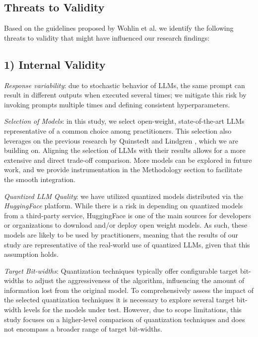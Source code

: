 \documentclass[conference]{IEEEtran}
\begin{document}
\subsection{Threats to Validity}

Based on the guidelines proposed by Wohlin et al. \cite{wohlin2012experimentation} we identify the following threats to validity that might have influenced our research findings: 

\subsection*{\textbf{1) Internal Validity}}

\textit{Response variability}: due to stochastic behavior of LLMs, the same prompt can result in different outputs when executed several times; we mitigate this risk by invoking prompts multiple times and defining consistent hyperparameters.

\textit{Selection of Models}: in this study, we select open-weight, state-of-the-art LLMs representative of a common choice among practitioners. This selection also leverages on the previous research by Quinstedt and Lindgren \cite{quinstedt2024Optimizing}, which we are building on. Aligning the selection of LLMs with their results allows for a more extensive and direct trade-off comparison. More models can be explored in future work, and we provide instrumentation in the Methodology section to facilitate the smooth integration.

\textit{Quantized LLM Quality}: we have utilized quantized models distributed via the \textit{HuggingFace} platform. While there is a risk in depending on quantized models from a third-party service, HuggingFace is one of the main sources for developers or organizations to download and/or deploy open weight models. As such, these models are likely to be used by practitioners, meaning that the results of our study are representative of the real-world use of quantized LLMs, given that this assumption holds.

\textit{Target Bit-widths}: Quantization techniques typically offer configurable target bit-widths to adjust the aggressiveness of the algorithm, influencing the amount of information lost from the original model. To comprehensively assess the impact of the selected quantization techniques it is necessary to explore several target bit-width levels for the models under test. However, due to scope limitations, this study focuses on a higher-level comparison of quantization techniques and does not encompass a broader range of target bit-widths. 
\end{document}
